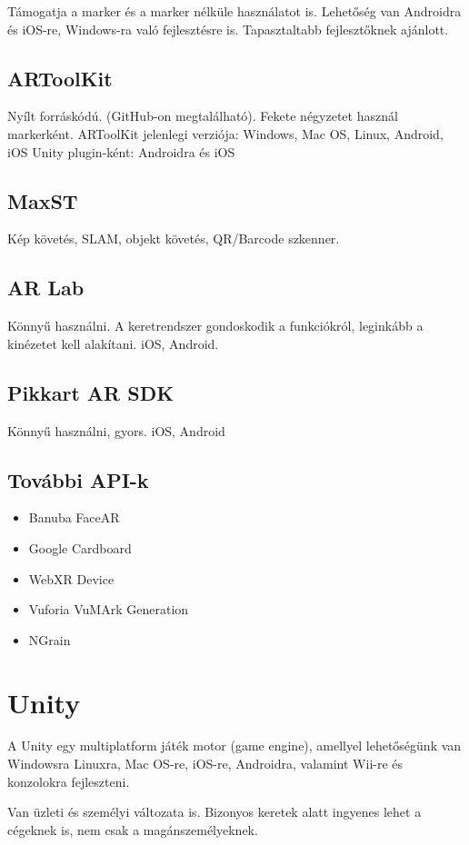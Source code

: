 \documentclass[a4paper,12pt]{article}
\begin{document}
Támogatja a marker és a marker nélküle használatot is. 
Lehetőség van Androidra és iOS-re, Windows-ra való fejlesztésre is.
Tapasztaltabb fejlesztőknek ajánlott. 

\subsection{ARToolKit}

Nyílt forráskódú. (GitHub-on megtalálható).
Fekete négyzetet használ markerként.
ARToolKit jelenlegi verziója: Windows, Mac OS,  Linux, Android, iOS
Unity plugin-ként: Androidra és iOS

\subsection{MaxST}

Kép követés, SLAM, objekt követés, QR/Barcode szkenner.

\subsection{AR Lab}

Könnyű használni. A keretrendszer gondoskodik a funkciókról, leginkább a kinézetet kell alakítani.
iOS, Android.

\subsection{Pikkart AR SDK}

Könnyű használni, gyors.
iOS, Android

\subsection{További API-k}

\begin{itemize}
\item Banuba FaceAR
\item Google Cardboard
\item WebXR Device 
\item Vuforia VuMArk Generation
\item NGrain
\end{itemize}

\section{Unity}

A Unity egy multiplatform játék motor (game engine), amellyel lehetőségünk van Windowsra Linuxra, Mac OS-re, iOS-re, Androidra, valamint Wii-re és konzolokra fejleszteni.

Van üzleti és személyi változata is. Bizonyos keretek alatt ingyenes lehet a cégeknek is, nem csak a magánszemélyeknek.
\end{document}
